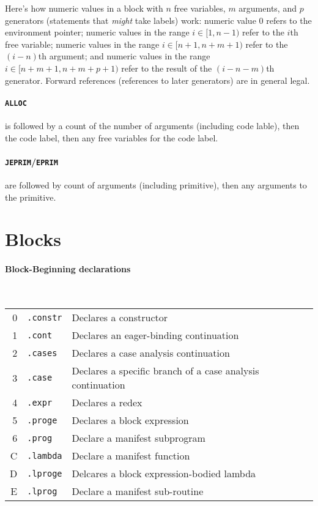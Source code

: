 \documentclass{article}
\begin{document}
Here's how numeric values in a block with $n$ free variables, $m$ arguments, and $p$ generators
(statements that \emph{might} take labels) work:
numeric value $0$ refers to the environment pointer;
numeric values in the range $i \in [1, n - 1)$ refer to the $i$th free variable;
numeric values in the range $i \in [n + 1, n + m + 1)$ refer to the $(i - n)$th argument; and
numeric values in the range $i \in [n + m + 1, n + m + p + 1)$ refer to the result of the $(i - n - m)$th generator.
Forward references (references to later generators) are in general legal.

\paragraph{\texttt{ALLOC}} is followed by a count of the number of arguments (including code lable),
then the code label,
then any free variables for the code label.

\paragraph{\texttt{JEPRIM}/\texttt{EPRIM}} are followed by count of arguments (including primitive),
then any arguments to the primitive.

\section{Blocks}

\paragraph{Block-Beginning declarations}\

\begin{tabular}{rl@{ --- }l}
  0 & \texttt{.constr} & Declares a constructor \\
  1 & \texttt{.cont} & Declares an eager-binding continuation \\
  2 & \texttt{.cases} & Declares a case analysis continuation \\
  3 & \texttt{.case} & Declares a specific branch of a case analysis continuation \\
  4 & \texttt{.expr} & Declares a redex \\
  5 & \texttt{.proge} & Declares a block expression \\
  6 & \texttt{.prog} & Declare a manifest subprogram \\
  C & \texttt{.lambda} & Declare a manifest function \\
  D & \texttt{.lproge} & Delcares a block expression-bodied lambda \\
  E & \texttt{.lprog} & Declare a manifest sub-routine \\
\end{tabular}
\end{document}
